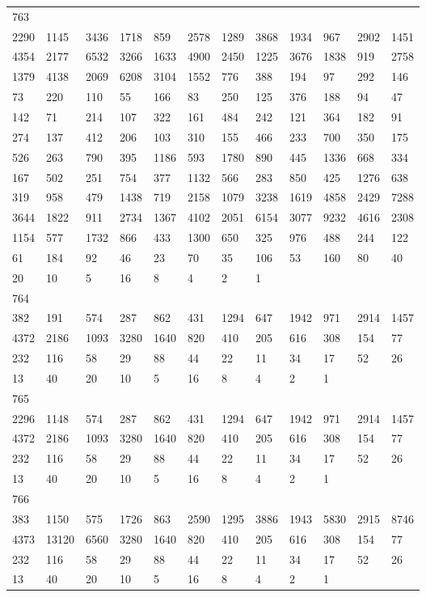 \begin{longtable}{llllllllllll}
763&&&&&&&&&&&\\
2290& 1145& 3436& 1718& 859& 2578& 1289& 3868& 1934& 967& 2902& 1451\\
4354& 2177& 6532& 3266& 1633& 4900& 2450& 1225& 3676& 1838& 919& 2758\\
1379& 4138& 2069& 6208& 3104& 1552& 776& 388& 194& 97& 292& 146\\
73& 220& 110& 55& 166& 83& 250& 125& 376& 188& 94& 47\\
142& 71& 214& 107& 322& 161& 484& 242& 121& 364& 182& 91\\
274& 137& 412& 206& 103& 310& 155& 466& 233& 700& 350& 175\\
526& 263& 790& 395& 1186& 593& 1780& 890& 445& 1336& 668& 334\\
167& 502& 251& 754& 377& 1132& 566& 283& 850& 425& 1276& 638\\
319& 958& 479& 1438& 719& 2158& 1079& 3238& 1619& 4858& 2429& 7288\\
3644& 1822& 911& 2734& 1367& 4102& 2051& 6154& 3077& 9232& 4616& 2308\\
1154& 577& 1732& 866& 433& 1300& 650& 325& 976& 488& 244& 122\\
61& 184& 92& 46& 23& 70& 35& 106& 53& 160& 80& 40\\
20& 10& 5& 16& 8& 4& 2& 1& \\

764&&&&&&&&&&&\\
382& 191& 574& 287& 862& 431& 1294& 647& 1942& 971& 2914& 1457\\
4372& 2186& 1093& 3280& 1640& 820& 410& 205& 616& 308& 154& 77\\
232& 116& 58& 29& 88& 44& 22& 11& 34& 17& 52& 26\\
13& 40& 20& 10& 5& 16& 8& 4& 2& 1& \\

765&&&&&&&&&&&\\
2296& 1148& 574& 287& 862& 431& 1294& 647& 1942& 971& 2914& 1457\\
4372& 2186& 1093& 3280& 1640& 820& 410& 205& 616& 308& 154& 77\\
232& 116& 58& 29& 88& 44& 22& 11& 34& 17& 52& 26\\
13& 40& 20& 10& 5& 16& 8& 4& 2& 1& \\

766&&&&&&&&&&&\\
383& 1150& 575& 1726& 863& 2590& 1295& 3886& 1943& 5830& 2915& 8746\\
4373& 13120& 6560& 3280& 1640& 820& 410& 205& 616& 308& 154& 77\\
232& 116& 58& 29& 88& 44& 22& 11& 34& 17& 52& 26\\
13& 40& 20& 10& 5& 16& 8& 4& 2& 1& \\


\end{longtable}
